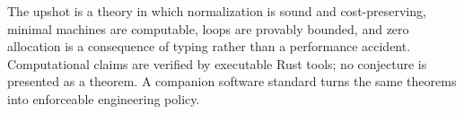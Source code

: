 The upshot is a theory in which normalization is sound and
cost-preserving, minimal machines are computable, loops are provably
bounded, and zero allocation is a consequence of typing rather than a
performance accident. Computational claims are verified by executable
Rust tools; no conjecture is presented as a theorem. A companion
software standard turns the same theorems into enforceable engineering
policy.
